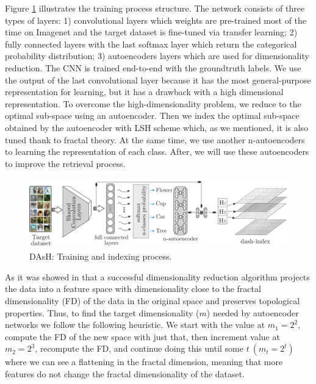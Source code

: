 \documentclass[conference]{IEEEtran}
\begin{document}
Figure \ref{fig:dash} illustrates the training process structure. The network consists of three types of layers: 1) convolutional layers   which weights are   pre-trained most of the time on Imagenet and the target dataset is fine-tuned via transfer learning; 2)  fully connected layers with the last softmax layer which return the categorical probability distribution; 3) autoencoders layers which are used for dimensionality reduction. The \acf{CNN} is trained end-to-end with the groundtruth labels.  We use the output of the last convolutional layer because it has the most general-purpose representation for learning, but it has a drawback with a high dimensional representation.     To overcome the high-dimensionality problem,  we reduce to the optimal sub-space using an autoencoder.  Then we index the optimal sub-space obtained by the autoencoder with LSH scheme which, as we mentioned, it is also tuned thank to fractal theory.  At the same time, we use another n-autoencoders to learning the representation of each class. After, we will use these autoencoders to improve the retrieval process.   

\begin{figure}[htp]\centering
\includegraphics[width=1.7\columnwidth]{dash/DAsh_learning_final.pdf}
\caption{ DAsH: Training and indexing process. } 
\label{fig:dash}
\end{figure} 		

As it was showed in \cite{citeulike:fractal:encoders} that a successful dimensionality reduction  algorithm projects the data into a feature space with dimensionality close to the fractal dimensionality (FD) of the data in the original space and preserves topological properties.  Thus, to find the target dimensionality ($m$) needed by  autoencoder networks we follow the following  heuristic.  We start with the value at $m_1 = 2^2$, compute the FD of the new space with just that, then increment  value at $m_2 = 2^3$, recompute the FD, and continue doing this until some $ t\ (m_t =  2 ^ t)$ where we can see a flattening in the fractal dimension, meaning that more features do not change the fractal dimensionality of the dataset. 
\end{document}
